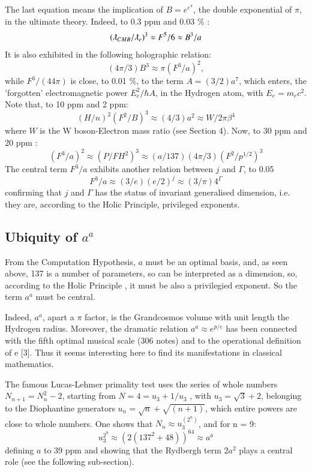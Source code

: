 \documentclass[twoside,draft]{article}
\begin{document}
\begin{sloppypar}
{The last equation means the implication of $B = e^{e^{\pi}}$, the double exponential of $\pi$, in the ultimate theory. Indeed, to 0.3 ppm and 0.03 \% :
\begin{equation}
(\lambdabar_{CMB}/\lambdabar_e)^3 \approx F^5/6 \approx B^3/a
\end{equation}
It is also exhibited in the following holographic relation:
\begin{equation}
(4\pi/3) B^3 \approx \pi(F^3/a)^2,
\end{equation}
while $F^3/(44\pi)$ is close, to 0.01 \%, to the term $A = (3/2) a^7$, which enters, the 'forgotten' electromagnetic power $E_e^2/\hbar A$, in the Hydrogen atom, with $E_e = m_ec^2$.
Note that, to 10 ppm and 2 ppm:
\begin{equation}
(H/n)^2(F^2/B)^3 \approx (4/3) a^2 \approx W/2\pi \beta^4
\end{equation}
where $W$ is the W boson-Electron mass ratio (see Section 4). Now, to 30 ppm and 20 ppm :  
\begin{equation}
 (F^3/a)^2 \approx (P/FH^2)^3  \approx  (a/137)(4\pi/3)(F^2/p^{1/2})^3 
\end{equation}
The central term $F^3/a$ exhibits another relation between $j$ and $\Gamma$, to 0.05 %
\begin{equation}
F^3/a \approx (3/e)(e/2)^j  \approx (3/\pi) 4^{\Gamma}
\end{equation}
confirming that $j$ and $\Gamma$ has the status of invariant generalised dimension, i.e. they are, according to the Holic Principle, privileged exponents.

\subsection{Ubiquity of $a^{a}$}

From the Computation Hypothesis, $a$ must be an optimal basis, and, as seen above, 137 is a number of parameters, so can be interpreted as a dimension, so, according to the Holic Principle , it must be also a privilegied exponent. So the term $a^a$ must be central.
    
Indeed, $a^a$, apart a $\pi$ factor, is the Grandcosmos volume with unit length the Hydrogen radius. Moreover, the dramatic relation $a^a\approx e^{p/e}$ has been connected with the fifth optimal musical scale (306 notes) and to the operational definition of e [3]. Thus it seems interesting here to find its manifestations in classical mathematics. 

The famous Lucas-Lehmer primality test uses the series of whole numbers $N_{n+1} = N_{n}^{2}-2$,
starting from $N = 4 = u_{3} + 1/u_{3}$ , with $u_{3} = \sqrt{3} + 2$, belonging to the Diophantine generators $u_{n} = \sqrt{n} + \sqrt{(n+1)}$, which entire powers are close to whole numbers. One shows that $N_{n} \approx u_{3}^{(2^{n})}$, and for n = 9:
\begin{equation}
u_{3}^{2^9} \approx (2(137^{2} + 48))^{64} \approx a^{a}
\end{equation}
defining $a$ to 39 ppm and showing that the Rydbergh term $2a^2$ plays a central role (see the following sub-section).

}
\end{sloppypar}
\end{document}

